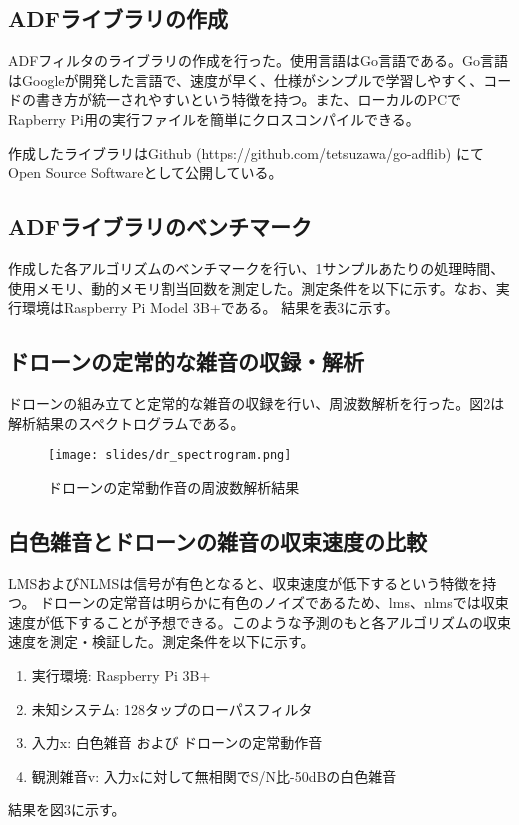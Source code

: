 \documentclass[a4paper, twocolumn]{ltjsarticle}
\begin{document}
  \subsection{ADFライブラリの作成}
    ADFフィルタのライブラリの作成を行った。使用言語はGo言語である。Go言語はGoogleが開発した言語で、速度が早く、仕様がシンプルで学習しやすく、コードの書き方が統一されやすいという特徴を持つ。また、ローカルのPCでRapberry Pi用の実行ファイルを簡単にクロスコンパイルできる。

    作成したライブラリはGithub (https://github.com/tetsuzawa/go-adflib) にてOpen Source Softwareとして公開している。

  \subsection{ADFライブラリのベンチマーク}
    作成した各アルゴリズムのベンチマークを行い、1サンプルあたりの処理時間、使用メモリ、動的メモリ割当回数を測定した。測定条件を以下に示す。なお、実行環境はRaspberry Pi Model 3B+である。
    結果を表3に示す。
    

  \subsection{ドローンの定常的な雑音の収録・解析}
    ドローンの組み立てと定常的な雑音の収録を行い、周波数解析を行った。図2は解析結果のスペクトログラムである。
    \begin{figure}[h]
      \centering
      \texttt{[image: slides/dr\_spectrogram.png]} \\
      \caption{ドローンの定常動作音の周波数解析結果}
      \label{fig:dr_spectrogram}
  \end{figure}

  \subsection{白色雑音とドローンの雑音の収束速度の比較}
    LMSおよびNLMSは信号が有色となると、収束速度が低下するという特徴を持つ。
    ドローンの定常音は明らかに有色のノイズであるため、lms、nlmsでは収束速度が低下することが予想できる。このような予測のもと各アルゴリズムの収束速度を測定・検証した。測定条件を以下に示す。
    \begin{enumerate}
      \renewcommand{\labelenumi}{(\arabic{enumi})}
      \item 実行環境: Raspberry Pi 3B+
      \item 未知システム: 128タップのローパスフィルタ
      \item 入力x: 白色雑音 および ドローンの定常動作音
      \item 観測雑音v: 入力xに対して無相関でS/N比-50dBの白色雑音
    \end{enumerate}  

    結果を図3に示す。
    

    
    
  



\end{document}
